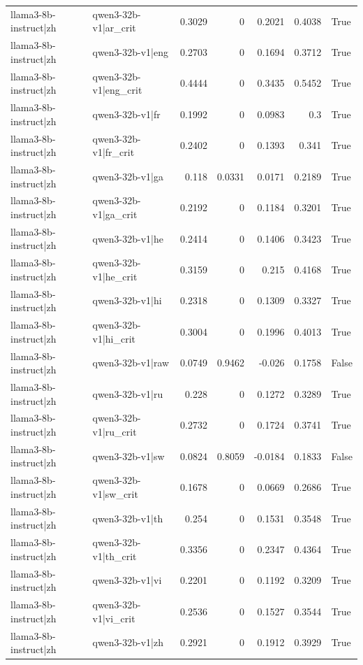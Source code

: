 \begin{table}
\begin{tabular}{l l r r r r l}
llama3-8b-instruct|zh & qwen3-32b-v1|ar_crit & 0.3029 & 0 & 0.2021 & 0.4038 & True \\
llama3-8b-instruct|zh & qwen3-32b-v1|eng & 0.2703 & 0 & 0.1694 & 0.3712 & True \\
llama3-8b-instruct|zh & qwen3-32b-v1|eng_crit & 0.4444 & 0 & 0.3435 & 0.5452 & True \\
llama3-8b-instruct|zh & qwen3-32b-v1|fr & 0.1992 & 0 & 0.0983 & 0.3 & True \\
llama3-8b-instruct|zh & qwen3-32b-v1|fr_crit & 0.2402 & 0 & 0.1393 & 0.341 & True \\
llama3-8b-instruct|zh & qwen3-32b-v1|ga & 0.118 & 0.0331 & 0.0171 & 0.2189 & True \\
llama3-8b-instruct|zh & qwen3-32b-v1|ga_crit & 0.2192 & 0 & 0.1184 & 0.3201 & True \\
llama3-8b-instruct|zh & qwen3-32b-v1|he & 0.2414 & 0 & 0.1406 & 0.3423 & True \\
llama3-8b-instruct|zh & qwen3-32b-v1|he_crit & 0.3159 & 0 & 0.215 & 0.4168 & True \\
llama3-8b-instruct|zh & qwen3-32b-v1|hi & 0.2318 & 0 & 0.1309 & 0.3327 & True \\
llama3-8b-instruct|zh & qwen3-32b-v1|hi_crit & 0.3004 & 0 & 0.1996 & 0.4013 & True \\
llama3-8b-instruct|zh & qwen3-32b-v1|raw & 0.0749 & 0.9462 & -0.026 & 0.1758 & False \\
llama3-8b-instruct|zh & qwen3-32b-v1|ru & 0.228 & 0 & 0.1272 & 0.3289 & True \\
llama3-8b-instruct|zh & qwen3-32b-v1|ru_crit & 0.2732 & 0 & 0.1724 & 0.3741 & True \\
llama3-8b-instruct|zh & qwen3-32b-v1|sw & 0.0824 & 0.8059 & -0.0184 & 0.1833 & False \\
llama3-8b-instruct|zh & qwen3-32b-v1|sw_crit & 0.1678 & 0 & 0.0669 & 0.2686 & True \\
llama3-8b-instruct|zh & qwen3-32b-v1|th & 0.254 & 0 & 0.1531 & 0.3548 & True \\
llama3-8b-instruct|zh & qwen3-32b-v1|th_crit & 0.3356 & 0 & 0.2347 & 0.4364 & True \\
llama3-8b-instruct|zh & qwen3-32b-v1|vi & 0.2201 & 0 & 0.1192 & 0.3209 & True \\
llama3-8b-instruct|zh & qwen3-32b-v1|vi_crit & 0.2536 & 0 & 0.1527 & 0.3544 & True \\
llama3-8b-instruct|zh & qwen3-32b-v1|zh & 0.2921 & 0 & 0.1912 & 0.3929 & True \\

\end{tabular}
\end{table}
